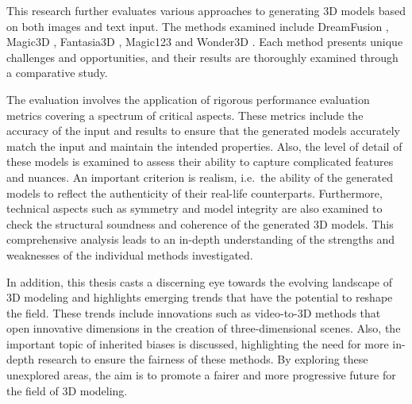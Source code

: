 This research further evaluates various approaches to generating 3D models based on both images and text input. The methods examined include DreamFusion \citep{pooleDreamfusion}, Magic3D \citep{lin2023magic3d}, Fantasia3D \citep{chen2023fantasia3d}, Magic123 \citep{qian2023magic123} and Wonder3D \citep{long2023wonder3d}. Each method presents unique challenges and opportunities, and their results are thoroughly examined through a comparative study. 

The evaluation involves the application of rigorous performance evaluation metrics covering a spectrum of critical aspects. These metrics include the accuracy of the input and results to ensure that the generated models accurately match the input and maintain the intended properties. Also, the level of detail of these models is examined to assess their ability to capture complicated features and nuances. An important criterion is realism, i.e.~the ability of the generated models to reflect the authenticity of their real-life counterparts. Furthermore, technical aspects such as symmetry and model integrity are also examined to check the structural soundness and coherence of the generated 3D models. This comprehensive analysis leads to an in-depth understanding of the strengths and weaknesses of the individual methods investigated.

In addition, this thesis casts a discerning eye towards the evolving landscape of 3D modeling and highlights emerging trends that have the potential to reshape the field. These trends include innovations such as video-to-3D methods that open innovative dimensions in the creation of three-dimensional scenes. Also, the important topic of inherited biases is discussed, highlighting the need for more in-depth research to ensure the fairness of these methods. By exploring these unexplored areas, the aim is to promote a fairer and more progressive future for the field of 3D modeling.